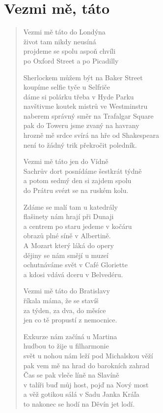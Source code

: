 \section{Vezmi mě, táto}

\thispagestyle{empty}

\begin{multicols}{2}
\begin{verse}

Vezmi mě táto do Londýna\\
život tam nikdy neusíná\\
projdeme se spolu aspoň chvíli\\
po Oxford Street a po Picadilly

Sherlockem můžem být na Baker Street\\
koupíme selfie tyče u Selfriče\\
dáme si polárku třeba v Hyde Parku\\
navštivme koutek mistrů ve Westminstru\\
naberem správný směr na Trafalgar Square\\
pak do Toweru jsme zvaný na havrany\\
hrozně mě srdce svírá na hře od Shakespeara\\
není to žádný trik překročit poledník.

Vezmi mě táto jen do Vídně\\
Sachrův dort posnídáme šestkrát týdně\\
a potom sedmý den si zajdem spolu\\
do Prátru svézt se na ruském kolu.

Zdáme se malí tam u katedrály\\
flašinety nám hrají při Dunaji\\
a centrem po staru jedeme v kočáru\\
obrazů plné síně v Albertině.\\
A Mozart který láká do opery\\
dějiny se nám smějí u muzeí\\
ochutnáváme svět v Café Gloriette\\
a kdosi vdává dceru v Belvedéru.

Vezmi mě táto do Bratislavy\\
říkala máma, že se stavíš\\
za týden, za dva, do měsíce\\
jen co tě propustí z nemocnice.

\columnbreak

Exkurze nám začíná u Martina\\
hudbou to žije u filharmonie\\
svět u nohou nám leží pod Michalskou věží\\
pak vem mě na hrad do barokních zahrad\\
Čas se pak vleče líně na Slavíně\\
v talíři buď můj host, pojď na Nový most\\
a věž gotikou sálá v Sadu Janka Kráľa\\
to nakonec se hodí na Děvín jet lodí.


\end{verse}
\end{multicols}
